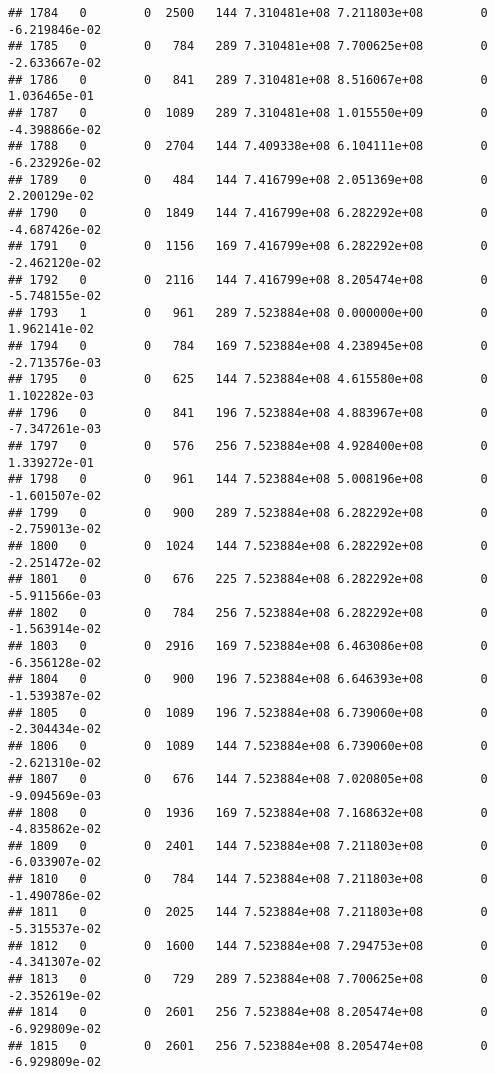 \documentclass[
]{article}
\begin{document}
\begin{enumerate}
\begin{verbatim}
## 1784   0        0  2500   144 7.310481e+08 7.211803e+08        0 -6.219846e-02
## 1785   0        0   784   289 7.310481e+08 7.700625e+08        0 -2.633667e-02
## 1786   0        0   841   289 7.310481e+08 8.516067e+08        0  1.036465e-01
## 1787   0        0  1089   289 7.310481e+08 1.015550e+09        0 -4.398866e-02
## 1788   0        0  2704   144 7.409338e+08 6.104111e+08        0 -6.232926e-02
## 1789   0        0   484   144 7.416799e+08 2.051369e+08        0  2.200129e-02
## 1790   0        0  1849   144 7.416799e+08 6.282292e+08        0 -4.687426e-02
## 1791   0        0  1156   169 7.416799e+08 6.282292e+08        0 -2.462120e-02
## 1792   0        0  2116   144 7.416799e+08 8.205474e+08        0 -5.748155e-02
## 1793   1        0   961   289 7.523884e+08 0.000000e+00        0  1.962141e-02
## 1794   0        0   784   169 7.523884e+08 4.238945e+08        0 -2.713576e-03
## 1795   0        0   625   144 7.523884e+08 4.615580e+08        0  1.102282e-03
## 1796   0        0   841   196 7.523884e+08 4.883967e+08        0 -7.347261e-03
## 1797   0        0   576   256 7.523884e+08 4.928400e+08        0  1.339272e-01
## 1798   0        0   961   144 7.523884e+08 5.008196e+08        0 -1.601507e-02
## 1799   0        0   900   289 7.523884e+08 6.282292e+08        0 -2.759013e-02
## 1800   0        0  1024   144 7.523884e+08 6.282292e+08        0 -2.251472e-02
## 1801   0        0   676   225 7.523884e+08 6.282292e+08        0 -5.911566e-03
## 1802   0        0   784   256 7.523884e+08 6.282292e+08        0 -1.563914e-02
## 1803   0        0  2916   169 7.523884e+08 6.463086e+08        0 -6.356128e-02
## 1804   0        0   900   196 7.523884e+08 6.646393e+08        0 -1.539387e-02
## 1805   0        0  1089   196 7.523884e+08 6.739060e+08        0 -2.304434e-02
## 1806   0        0  1089   144 7.523884e+08 6.739060e+08        0 -2.621310e-02
## 1807   0        0   676   144 7.523884e+08 7.020805e+08        0 -9.094569e-03
## 1808   0        0  1936   169 7.523884e+08 7.168632e+08        0 -4.835862e-02
## 1809   0        0  2401   144 7.523884e+08 7.211803e+08        0 -6.033907e-02
## 1810   0        0   784   144 7.523884e+08 7.211803e+08        0 -1.490786e-02
## 1811   0        0  2025   144 7.523884e+08 7.211803e+08        0 -5.315537e-02
## 1812   0        0  1600   144 7.523884e+08 7.294753e+08        0 -4.341307e-02
## 1813   0        0   729   289 7.523884e+08 7.700625e+08        0 -2.352619e-02
## 1814   0        0  2601   256 7.523884e+08 8.205474e+08        0 -6.929809e-02
## 1815   0        0  2601   256 7.523884e+08 8.205474e+08        0 -6.929809e-02

\end{verbatim}
\end{enumerate}
\end{document}
